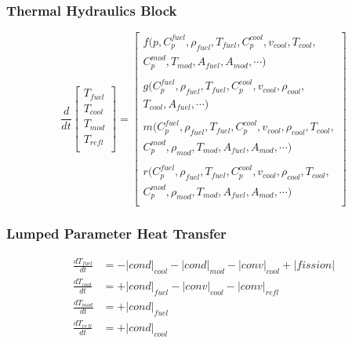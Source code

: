 \begin{frame}[fragile]
  \frametitle{Thermal Hydraulics Block}
  \footnotesize{
  \begin{equation} 
  \frac{d}{dt}\left[
    \begin{array}{c}
      T_{fuel} \\
      T_{cool} \\
      T_{mod} \\
      T_{refl} \\
    \end{array}
    \right]
    =
    \left[
      \begin{array}{ r }
        f(p, C_p^{fuel}, \rho_{fuel}, T_{fuel}, C_p^{cool}, v_{cool}, T_{cool},\\ 
          C_p^{mod}, T_{mod}, A_{fuel}, A_{mod}, \cdots )\\
          \\
        g(C_p^{fuel}, \rho_{fuel}, T_{fuel}, C_p^{cool}, v_{cool}, \rho_{cool},\\
          T_{cool}, A_{fuel}, \cdots )\\
          \\
        m(C_p^{fuel}, \rho_{fuel}, T_{fuel}, C_p^{cool}, v_{cool}, \rho_{cool},T_{cool},\\
         C_p^{mod}, \rho_{mod}, T_{mod}, A_{fuel}, A_{mod}, \cdots )\\
        \\
        r(C_p^{fuel}, \rho_{fuel}, T_{fuel}, C_p^{cool}, v_{cool}, \rho_{cool}, T_{cool},\\
         C_p^{mod}, \rho_{mod}, T_{mod}, A_{fuel}, A_{mod}, \cdots )\\
      \end{array}
      \right]
      \label{eqn:th_prke_fuller}
    \end{equation}
  
  }
\end{frame}



\begin{frame}[fragile]
  \frametitle{Lumped Parameter Heat Transfer}
\footnotesize{
  \begin{align} 
    \frac{dT_{fuel}}{dt} &=  - |cond|_{cool} - |cond|_{mod} - |conv|_{cool} + |fission|\\
    \frac{dT_{cool}}{dt} &=  + |cond|_{fuel} - |conv|_{cool} - |conv|_{refl} \\
    \frac{dT_{mod}}{dt}  &=  + |cond|_{fuel}\\
    \frac{dT_{refl}}{dt} &=  + |cond|_{cool}
  \end{align}
}
\end{frame}

